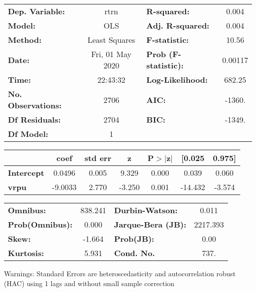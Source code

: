 \begin{center}
\begin{tabular}{lclc}
\toprule
\textbf{Dep. Variable:}    &       rtrn       & \textbf{  R-squared:         } &     0.004   \\
\textbf{Model:}            &       OLS        & \textbf{  Adj. R-squared:    } &     0.004   \\
\textbf{Method:}           &  Least Squares   & \textbf{  F-statistic:       } &     10.56   \\
\textbf{Date:}             & Fri, 01 May 2020 & \textbf{  Prob (F-statistic):} &  0.00117    \\
\textbf{Time:}             &     22:43:32     & \textbf{  Log-Likelihood:    } &    682.25   \\
\textbf{No. Observations:} &        2706      & \textbf{  AIC:               } &    -1360.   \\
\textbf{Df Residuals:}     &        2704      & \textbf{  BIC:               } &    -1349.   \\
\textbf{Df Model:}         &           1      & \textbf{                     } &             \\
\bottomrule
\end{tabular}
\begin{tabular}{lcccccc}
                   & \textbf{coef} & \textbf{std err} & \textbf{z} & \textbf{P$> |$z$|$} & \textbf{[0.025} & \textbf{0.975]}  \\
\midrule
\textbf{Intercept} &       0.0496  &        0.005     &     9.329  &         0.000        &        0.039    &        0.060     \\
\textbf{vrpu}      &      -9.0033  &        2.770     &    -3.250  &         0.001        &      -14.432    &       -3.574     \\
\bottomrule
\end{tabular}
\begin{tabular}{lclc}
\textbf{Omnibus:}       & 838.241 & \textbf{  Durbin-Watson:     } &    0.011  \\
\textbf{Prob(Omnibus):} &   0.000 & \textbf{  Jarque-Bera (JB):  } & 2217.393  \\
\textbf{Skew:}          &  -1.664 & \textbf{  Prob(JB):          } &     0.00  \\
\textbf{Kurtosis:}      &   5.931 & \textbf{  Cond. No.          } &     737.  \\
\bottomrule
\end{tabular}
\end{center}

Warnings: \newline
 [1] Standard Errors are heteroscedasticity and autocorrelation robust (HAC) using 1 lags and without small sample correction